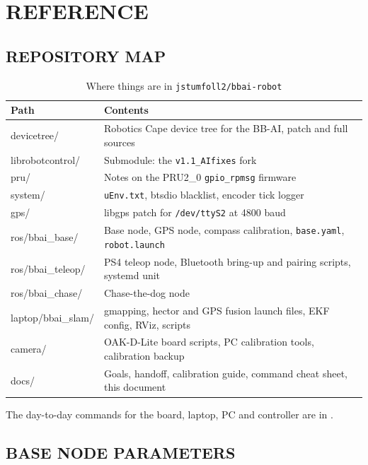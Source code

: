 \chapter{REFERENCE}
\label{app:ref}

\section{REPOSITORY MAP}

\begin{table}[htbp]
\centering
\caption{Where things are in \texttt{jstumfoll2/bbai-robot}}
\small
\begin{tabularx}{\linewidth}{>{\ttfamily\raggedright\arraybackslash}p{2.3in}X}
\toprule
\normalfont Path & Contents \\
\midrule
devicetree/ & Robotics Cape device tree for the BB-AI, patch and full sources \\
librobotcontrol/ & Submodule: the \texttt{v1.1\_AIfixes} fork \\
pru/ & Notes on the PRU2\_0 \texttt{gpio\_rpmsg} firmware \\
system/ & \texttt{uEnv.txt}, btsdio blacklist, encoder tick logger \\
gps/ & libgps patch for \texttt{/dev/ttyS2} at 4800 baud \\
ros/bbai\_base/ & Base node, GPS node, compass calibration, \texttt{base.yaml}, \texttt{robot.launch} \\
ros/bbai\_teleop/ & PS4 teleop node, Bluetooth bring-up and pairing scripts, systemd unit \\
ros/bbai\_chase/ & Chase-the-dog node \\
laptop/bbai\_slam/ & gmapping, hector and GPS fusion launch files, EKF config, RViz, scripts \\
camera/ & OAK-D-Lite board scripts, PC calibration tools, calibration backup \\
docs/ & Goals, handoff, calibration guide, command cheat sheet, this document \\
\bottomrule
\end{tabularx}
\end{table}

The day-to-day commands for the board, laptop, PC and controller are in
.

\section{BASE NODE PARAMETERS}

